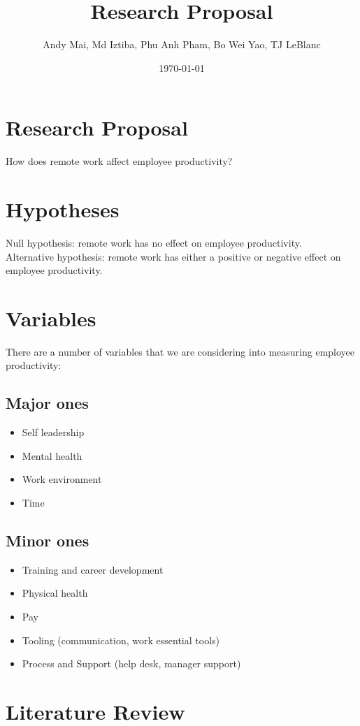 \documentclass[12pt]{article}
\title{Research Proposal}
\author{Andy Mai, Md Iztiba, Phu Anh Pham, Bo Wei Yao, TJ LeBlanc}
\date{\today}
\begin{document}
\maketitle

\section*{Research Proposal}
How does remote work affect employee productivity?

\section*{Hypotheses}
Null hypothesis: remote work has no effect on employee productivity. \\
Alternative hypothesis: remote work has either a positive or negative effect on employee productivity. 

\section*{Variables}
There are a number of variables that we are considering into measuring employee productivity: 

\subsection*{Major ones}
\begin{itemize}
  \item Self leadership 
  \item Mental health 
  \item Work environment 
  \item Time
\end{itemize}

\subsection*{Minor ones}
\begin{itemize}
  \item Training and career development 
  \item Physical health 
  \item Pay
  \item Tooling (communication, work essential tools)
  \item Process and Support (help desk, manager support)
\end{itemize}


\section*{Literature Review}
\end{document}
